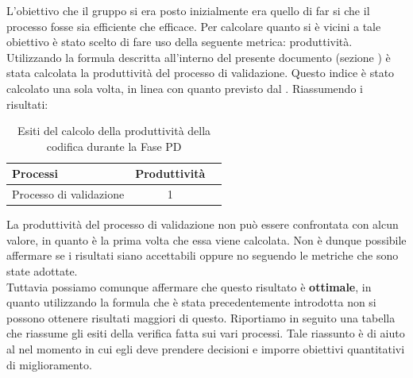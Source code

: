 				L'obiettivo che il gruppo si era posto inizialmente era quello di far si che il processo fosse sia efficiente che efficace. Per calcolare quanto si è vicini a tale obiettivo è stato scelto di fare uso della seguente metrica: produttività.\\
				Utilizzando la formula descritta all'interno del presente documento (sezione ) è stata calcolata la produttività del processo di validazione. Questo indice è stato calcolato una sola volta, in linea con quanto previsto dal . Riassumendo i risultati:
				\begin{table}[H]
			    	\centering
					\begin{tabu}{| l | c | c |}
						\hline
							Processi 				  & Produttività   \\ \hline \hline
							Processo di validazione   & 1              \\ \hline
					\end{tabu}
					\caption{Esiti del calcolo della produttività della codifica durante la Fase PD}
				\end{table}
				La produttività del processo di validazione non può essere confrontata con alcun valore, in quanto è la prima volta che essa viene calcolata. Non è dunque possibile affermare se i risultati siano accettabili oppure no seguendo le metriche che sono state adottate.\\
				Tuttavia possiamo comunque affermare che questo risultato è \textbf{ottimale}, in quanto utilizzando la formula che è stata precedentemente introdotta non si possono ottenere risultati maggiori di questo.
			Riportiamo in seguito una tabella che riassume gli esiti della verifica fatta sui vari processi. Tale riassunto è di aiuto al  nel momento in cui egli deve prendere decisioni e imporre obiettivi quantitativi di miglioramento.
